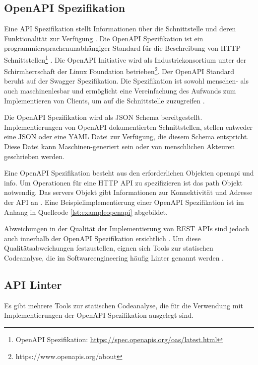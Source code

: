 \subsection{OpenAPI Spezifikation} \label{sec: openapisepzifikation}
Eine API Spezifikation stellt Informationen über die Schnittstelle und deren Funktionalität zur Verfügung \parencite{sommerville_software_2018}. Die OpenAPI Spezifikation ist ein programmiersprachenunabhängiger Standard für die Beschreibung von \acs{HTTP} Schnittstellen\footnote{OpenAPI Spezifikation: \href{https://spec.openapis.org/oas/latest.html}{https://spec.openapis.org/oas/latest.html}} \parencite{noauthor_openapi_2024}. Die OpenAPI Initiative wird als Industriekonsortium unter der Schirmherrschaft der Linux Foundation betrieben\footnote{https://www.openapis.org/about}. Der OpenAPI Standard beruht auf der Swagger Spezifikation. Die Spezifikation ist sowohl menschen- als auch maschinenlesbar und ermöglicht eine Vereinfachung des Aufwands zum Implementieren von Clients, um auf die Schnittstelle zuzugreifen \parencite{eriksson_using_2023}. 

Die OpenAPI Spezifikation wird als \acf{JSON} Schema bereitgestellt. Implementierungen von OpenAPI dokumentierten Schnittstellen, stellen entweder eine \acs{JSON} oder eine \acf{YAML} Datei zur Verfügung, die diesem Schema entspricht. Diese Datei kann Maschinen-generiert sein oder von menschlichen Akteuren geschrieben werden. 

Eine OpenAPI Spezifikation besteht aus den erforderlichen Objekten openapi und info. Um Operationen für eine \acs{HTTP} \acs{API} zu spezifizieren ist das path Objekt notwendig. Das servers Objekt gibt Informationen zur Konnektivität und Adresse der \acs{API} an \parencite{noauthor_openapi_2024}. Eine Beispielimplementierung einer OpenAPI Spezifikation ist im Anhang in Quellcode \ref{lst:exampleopenapi} abgebildet.

Abweichungen in der Qualität der Implementierung von \acs{REST} \acs{API}s sind jedoch auch innerhalb der OpenAPI Spezifikation ersichtlich \parencite{vaziri_generating_2017}. Um diese Qualitätsabweichungen festzustellen, eignen sich Tools zur statischen Codeanalyse, die im Softwareengineering häufig Linter genannt werden \parencite{tomasdottir_adoption_2018}.

\subsection{API Linter} \label{sec:apilinter}
Es gibt mehrere Tools zur statischen Codeanalyse, die für die Verwendung mit Implementierungen der OpenAPI Spezifikation ausgelegt sind.

